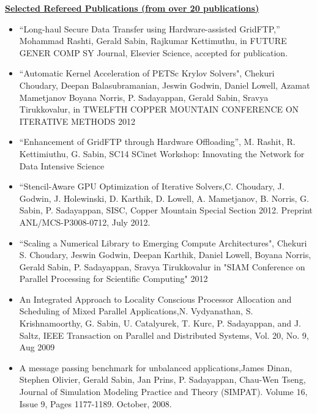  {\bf {\underline{Selected Refereed Publications (from over 20 publications)}}}
 \begin{itemize}
 	
 	\item ``Long-haul Secure Data Transfer using Hardware-assisted GridFTP,'' Mohammad Rashti, Gerald Sabin, Rajkumar Kettimuthu, in FUTURE GENER COMP SY Journal, Elsevier Science, accepted for publication.
 	
 	\item ``Automatic Kernel Acceleration of PETSc Krylov Solvers",
 	Chekuri Choudary, Deepan Balasubramanian, Jeswin Godwin, Daniel
 	Lowell, Azamat Mametjanov Boyana Norris, P. Sadayappan, Gerald
 	Sabin, Sravya Tirukkovalur, in TWELFTH COPPER MOUNTAIN CONFERENCE ON
 	ITERATIVE METHODS 2012
 	
 	
  	   \item ``Enhancement of GridFTP through Hardware Offloading'',
  	   M. Rashit, R. Kettimiuthu, G. Sabin, SC14 SCinet Workshop:
  	   Innovating the Network for Data Intensive Science
 	
 	\item ``Stencil-Aware GPU Optimization
 	of Iterative Solvers,C. Choudary, J. Godwin, J. Holewinski,
 	D. Karthik, D. Lowell, A. Mametjanov, B. Norris, G. Sabin,
 	P. Sadayappan, SISC, Copper Mountain Special Section 2012. Preprint
 	ANL/MCS-P3008-0712, July 2012.
 	
 	\item ``Scaling a Numerical Library to Emerging Compute
 	Architectures", Chekuri S. Choudary, Jeswin Godwin, Deepan Karthik,
 	Daniel Lowell, Boyana Norris, Gerald Sabin, P. Sadayappan, Sravya
 	Tirukkovalur in "SIAM Conference on Parallel Processing for
 	Scientific Computing" 2012
 	
 	  \item An Integrated Approach to Locality Conscious Processor
 	  Allocation and Scheduling of Mixed Parallel
 	  Applications,N. Vydyanathan, S. Krishnamoorthy, G. Sabin,
 	  U. Catalyurek, T. Kurc, P. Sadayappan, and J. Saltz, IEEE
 	  Transaction on Parallel and Distributed Systems, Vol. 20, No. 9, Aug
 	  2009
 	
 	  \item A message passing benchmark for unbalanced applications,James
 	  Dinan, Stephen Olivier, Gerald Sabin, Jan Prins, P. Sadayappan,
 	  Chau-Wen Tseng, Journal of Simulation Modeling Practice and Theory
 	  (SIMPAT). Volume 16, Issue 9, Pages 1177-1189. October, 2008.
 	

\end{itemize}
